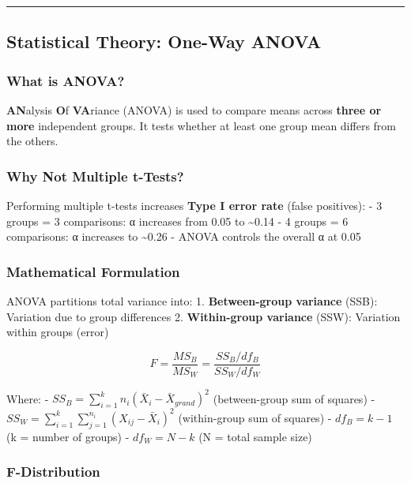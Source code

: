 \documentclass[11pt]{article}
\begin{document}
\begin{center}\rule{0.5\linewidth}{0.5pt}\end{center}

    \subsection{Statistical Theory: One-Way
ANOVA}\label{statistical-theory-one-way-anova}

\subsubsection{What is ANOVA?}\label{what-is-anova}

\textbf{AN}alysis \textbf{O}f \textbf{VA}riance (ANOVA) is used to
compare means across \textbf{three or more} independent groups. It tests
whether at least one group mean differs from the others.

\subsubsection{Why Not Multiple
t-Tests?}\label{why-not-multiple-t-tests}

Performing multiple t-tests increases \textbf{Type I error rate} (false
positives): - 3 groups = 3 comparisons: α increases from 0.05 to
\textasciitilde0.14 - 4 groups = 6 comparisons: α increases to
\textasciitilde0.26 - ANOVA controls the overall α at 0.05

\subsubsection{Mathematical Formulation}\label{mathematical-formulation}

ANOVA partitions total variance into: 1. \textbf{Between-group variance}
(SSB): Variation due to group differences 2. \textbf{Within-group
variance} (SSW): Variation within groups (error)

\[F = \frac{MS_B}{MS_W} = \frac{SS_B / df_B}{SS_W / df_W}\]

Where: - \(SS_B = \sum_{i=1}^{k} n_i(\bar{X}_i - \bar{X}_{grand})^2\)
(between-group sum of squares) -
\(SS_W = \sum_{i=1}^{k} \sum_{j=1}^{n_i} (X_{ij} - \bar{X}_i)^2\)
(within-group sum of squares) - \(df_B = k - 1\) (k = number of groups)
- \(df_W = N - k\) (N = total sample size)

\subsubsection{F-Distribution}\label{f-distribution}
\end{document}
